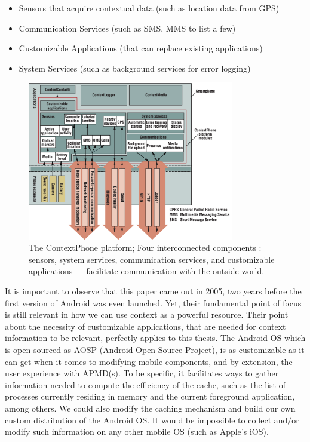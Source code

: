 \documentclass[12pt]{uthesis-v12}  %
\begin{document}
		\begin{itemize}
			\item Sensors that acquire contextual data (such as location data from GPS)
			\item Communication Services (such as SMS, MMS to list a few)
			\item Customizable Applications (that can replace existing applications)
			\item System Services (such as background services for error logging)
		\end{itemize}
		
		
		\begin{figure}[!ht]
			\centering
			\includegraphics[width = 90mm]{images/contextPhone.png}
			\caption[Context Phone]
			{The ContextPhone platform; Four interconnected components : sensors, system services, communication services, and customizable applications — facilitate communication with the outside world.}
		\end{figure}
		
		It is important to observe that this paper came out in 2005, two years before the first version of Android was even launched. Yet, their fundamental point of focus is still relevant in how we can use context as a powerful resource. Their point about the necessity of customizable applications, that are needed for context information to be relevant, perfectly applies to this thesis. The Android OS which is open sourced as AOSP (Android Open Source Project), is as customizable as it can get when it comes to modifying mobile components, and by extension, the user experience with APMD(s). To be specific, it facilitates ways to gather information needed to compute the efficiency of the cache, such as the list of processes currently residing in memory and the current foreground application, among others. We could also modify the caching mechanism and build our own custom distribution of the Android OS. It would be impossible to collect and/or modify such information on any other mobile OS (such as Apple's iOS).
		
\end{document}
